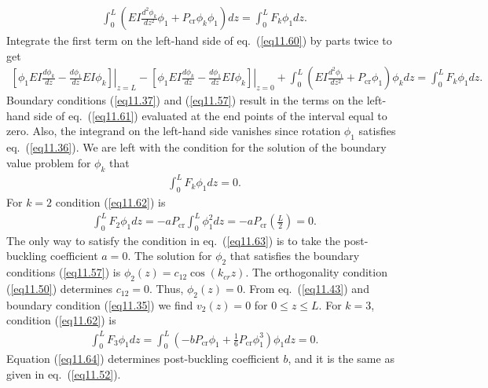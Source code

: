 \documentclass{AeroStructure-ERJohnson}
\begin{document}
\begin{align}\label{eq11.60}
\int_{0}^{L}\left(E I \frac{d^{2} \phi_{k}}{d z^{2}} \phi_{1}+P_{\mathrm{cr}} \phi_{k} \phi_{1}\right) d z=\int_{0}^{L} F_{k} \phi_{1} d z.
\end{align}
Integrate the first term on the left-hand side of eq.~(\ref{eq11.60}) by parts twice to get
\begin{align}\label{eq11.61}
\left.\left[\phi_{1} E I \frac{d \phi_{k}}{d z}-\frac{d \phi_{1}}{d z} E I \phi_{k}\right]\right|_{z=L}-\left.\left[\phi_{1} E I \frac{d \phi_{k}}{d z}-\frac{d \phi_{1}}{d z} E I \phi_{k}\right]\right|_{z=0}+\int_{0}^{L}\left(E I \frac{d^{2} \phi_{1}}{d z^{2}}+P_{\mathrm{cr}} \phi_{1}\right) \phi_{k} d z=\int_{0}^{L} F_{k} \phi_{1} d z.
\end{align}
Boundary conditions (\ref{eq11.37}) and (\ref{eq11.57}) result in the terms on the left-hand side of eq.~(\ref{eq11.61}) evaluated at the end points of the interval equal to zero. Also, the integrand on the left-hand side vanishes since rotation $\phi_{1}$ satisfies eq.~(\ref{eq11.36}). We are left with the condition for the solution of the boundary value problem for $\phi_{k}$ that
\begin{align}\label{eq11.62}
\int_{0}^{L} F_{k} \phi_{1} d z=0.
\end{align}
For $k=2$ condition (\ref{eq11.62}) is
\begin{align}\label{eq11.63}
\int_{0}^{L} F_{2} \phi_{1} d z=-a P_{\mathrm{cr}} \int_{0}^{L} \phi_{1}^{2} d z=-a P_{\mathrm{cr}}\left(\frac{L}{2}\right)=0.
\end{align}
The only way to satisfy the condition in eq.~(\ref{eq11.63}) is to take the post-buckling coefficient $a=0$. The solution for $\phi_{2}$ that satisfies the boundary conditions (\ref{eq11.57}) is $\phi_{2}(z)=c_{12} \cos \left(k_{c r} z\right)$. The orthogonality condition (\ref{eq11.50}) determines $c_{12}=0$. Thus, $\phi_{2}(z)=0$. From eq.~(\ref{eq11.43}) and boundary condition (\ref{eq11.35}) we find $v_{2}(z)=0$ for ${0 \leq z \leq L}$. For $k=3$, condition (\ref{eq11.62}) is
\begin{align}\label{eq11.64}
\int_{0}^{L} F_{3} \phi_{1} d z=\int_{0}^{L}\left(-b P_{\mathrm{cr}} \phi_{1}+\frac{1}{6} P_{\mathrm{cr}} \phi_{1}^{3}\right) \phi_{1} d z=0.
\end{align}
Equation (\ref{eq11.64}) determines post-buckling coefficient $b$, and it is the same as given in eq.~(\ref{eq11.52}).
\vspace*{8pt}
\pagebreak
\end{document}

